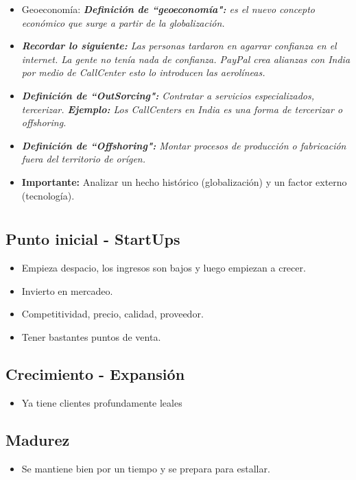 \begin{itemize}
    \item Geoeconomía: \emph{\textbf{Definición de ``geoeconomía":} es el nuevo concepto económico que surge a partir de la globalización.}
    \item \emph{\textbf{Recordar lo siguiente: }Las personas tardaron en agarrar confianza en el internet. La gente no tenía nada de confianza. PayPal crea alianzas con India por medio de CallCenter esto lo introducen las aerolíneas.}
    \item \emph{\textbf{Definición de ``OutSorcing":} Contratar a servicios especializados, tercerizar. \emph{\textbf{Ejemplo: }Los CallCenters en India es una forma de tercerizar o offshoring.}}
    \item \emph{\textbf{Definición de ``Offshoring":} Montar procesos de producción o fabricación fuera del territorio de orígen.}
    \item \textbf{Importante:} Analizar un hecho histórico (globalización) y un factor externo (tecnología).
\end{itemize}

\section{}
\subsection{Punto inicial - StartUps}
\begin{itemize}
    \item Empieza despacio, los ingresos son bajos y luego empiezan a crecer.
    \item Invierto en mercadeo.
    \item Competitividad, precio, calidad, proveedor. 
    \item Tener bastantes puntos de venta.
\end{itemize}

\subsection{Crecimiento - Expansión}
\begin{itemize}
    \item Ya tiene clientes profundamente leales
\end{itemize}

\subsection{Madurez}
\begin{itemize}
    \item Se mantiene bien por un tiempo y se prepara para estallar.
\end{itemize}

